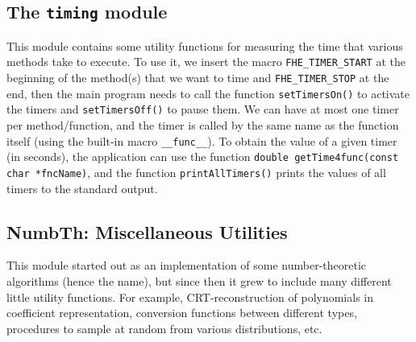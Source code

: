 \documentclass[14pt]{extarticle}
\def\NumbTh{\textsf{NumbTh}}
\begin{document}
\subsection{The \texttt{timing} module}\label{timing}
This module contains some utility functions for measuring the time
that various methods take to execute. To use it, we insert the macro
\texttt{FHE\_TIMER\_START} at the beginning of the method(s) that we
want to time and \texttt{FHE\_TIMER\_STOP} at the end, then the main
program needs to call the function \texttt{setTimersOn()} to activate
the timers and \texttt{setTimersOff()} to pause them. 
We can have at most one timer per method/function, and the timer
is called by the same name as the function itself (using the
built-in macro \texttt{\_\_func\_\_}). To obtain the value
of a given timer (in seconds), the application can use the function
\texttt{double getTime4func(const char *fncName)}, and the function
\texttt{printAllTimers()} prints the values of all timers to the
standard output.

\subsection{{\NumbTh}: Miscellaneous Utilities}
\label{sec:numbTh}
This module started out as an implementation of some number-theoretic
algorithms (hence the name), but since then it grew to include many
different little utility functions. For example, CRT-reconstruction
of polynomials in coefficient representation, conversion functions
between different types, procedures to sample at random from various
distributions, etc.

\end{document}
